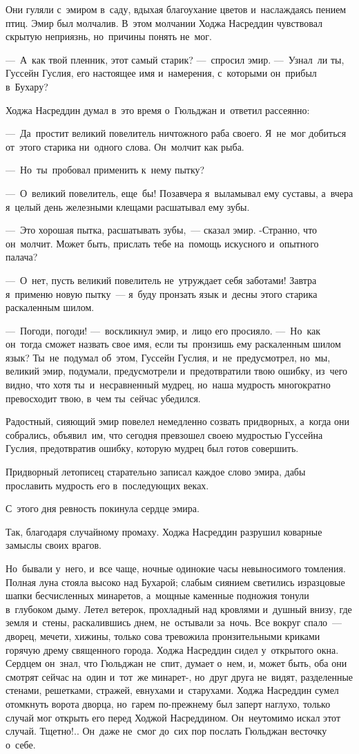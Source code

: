 \documentclass[12pt,a4paper]{book}
\begin{document}
Они гуляли с~эмиром в~саду, вдыхая благоухание цветов и~наслаждаясь пением птиц. Эмир был молчалив. В~этом молчании Ходжа Насреддин чувствовал скрытую неприязнь, но~причины понять не~мог.

—~А~как твой пленник, этот самый старик? —~спросил эмир. —~Узнал~ли ты, Гуссейн Гуслия, его настоящее имя и~намерения, с~которыми он~прибыл в~Бухару?

Ходжа Насреддин думал в~это время о~Гюльджан и~ответил рассеянно:

—~Да~простит великий повелитель ничтожного раба своего. Я~не~мог добиться от~этого старика ни~одного слова. Он~молчит как рыба.

—~Но~ты~пробовал применить к~нему пытку?

—~О~великий повелитель, еще~бы! Позавчера я~выламывал ему суставы, а~вчера я~целый день железными клещами расшатывал ему зубы.

—~Это хорошая пытка, расшатывать зубы,~— сказал эмир. -Странно, что он~молчит. Может быть, прислать тебе на~помощь искусного и~опытного палача?

—~О~нет, пусть великий повелитель не~утруждает себя заботами! Завтра я~применю новую пытку~— я~буду пронзать язык и~десны этого старика раскаленным шилом.

—~Погоди, погоди! —~воскликнул эмир, и~лицо его просияло. —~Но~как он~тогда сможет назвать свое имя, если ты~пронзишь ему раскаленным шилом язык? Ты~не~подумал об~этом, Гуссейн Гуслия, и~не~предусмотрел, но~мы, великий эмир, подумали, предусмотрели и~предотвратили твою ошибку, из~чего видно, что хотя ты~и~несравненный мудрец, но~наша мудрость многократно превосходит твою, в~чем ты~сейчас убедился.

Радостный, сияющий эмир повелел немедленно созвать придворных, а~когда они собрались, объявил~им, что сегодня превзошел своею мудростью Гуссейна Гуслия, предотвратив ошибку, которую мудрец был готов совершить.

Придворный летописец старательно записал каждое слово эмира, дабы прославить мудрость его в~последующих веках.

С~этого дня ревность покинула сердце эмира.

Так, благодаря случайному промаху. Ходжа Насреддин разрушил коварные замыслы своих врагов.

Но~бывали у~него, и~все чаще, ночные одинокие часы невыносимого томления. Полная луна стояла высоко над Бухарой; слабым сиянием светились изразцовые шапки бесчисленных минаретов, а~мощные каменные подножия тонули в~глубоком дыму. Летел ветерок, прохладный над кровлями и~душный внизу, где земля и~стены, раскалившись днем, не~остывали за~ночь. Все вокруг спало~— дворец, мечети, хижины, только сова тревожила пронзительными криками горячую дрему священного города. Ходжа Насреддин сидел у~открытого окна. Сердцем он~знал, что Гюльджан не~спит, думает о~нем, и, может быть, оба они смотрят сейчас на~один и~тот~же минарет-, но~друг друга не~видят, разделенные стенами, решетками, стражей, евнухами и~старухами. Ходжа Насреддин сумел отомкнуть ворота дворца, но~гарем по-прежнему был заперт наглухо, только случай мог открыть его перед Ходжой Насреддином. Он~неутомимо искал этот случай. Тщетно!.. Он~даже не~смог до~сих пор послать Гюльджан весточку о~себе.
\end{document}
